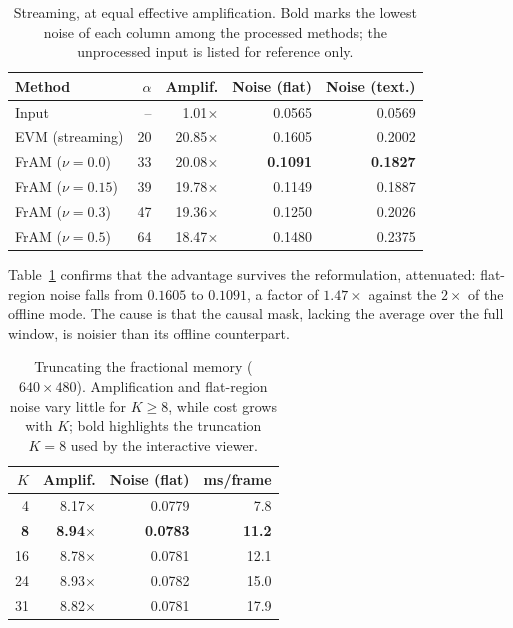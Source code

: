 \documentclass[conference]{IEEEtran}
\begin{document}
\begin{table}[t]
\caption{Streaming, at equal effective amplification. Bold marks the lowest
noise of each column among the processed methods; the unprocessed input is
listed for reference only.}
\label{tab:rt}
\centering
\begin{tabular}{lrrrr}
\toprule
Method & $\alpha$ & Amplif. & Noise (flat) & Noise (text.) \\
\midrule
Input            & --  & 1.01$\times$  & 0.0565 & 0.0569 \\
EVM (streaming)  & 20  & 20.85$\times$ & 0.1605 & 0.2002 \\
FrAM ($\nu=0.0$)  & 33  & 20.08$\times$ & \textbf{0.1091} & \textbf{0.1827} \\
FrAM ($\nu=0.15$) & 39  & 19.78$\times$ & 0.1149 & 0.1887 \\
FrAM ($\nu=0.3$)  & 47  & 19.36$\times$ & 0.1250 & 0.2026 \\
FrAM ($\nu=0.5$)  & 64  & 18.47$\times$ & 0.1480 & 0.2375 \\
\bottomrule
\end{tabular}
\end{table}

Table~\ref{tab:rt} confirms that the advantage survives the reformulation,
attenuated: flat-region noise falls from $0.1605$ to $0.1091$, a factor of
$1.47\times$ against the $2\times$ of the offline mode. The cause is that the
causal mask, lacking the average over the full window, is noisier than its
offline counterpart.

\begin{table}[t]
\caption{Truncating the fractional memory ($640\times480$). Amplification and
flat-region noise vary little for $K \geq 8$, while cost grows with $K$; bold
highlights the truncation $K = 8$ used by the interactive viewer.}
\label{tab:memory}
\centering
\begin{tabular}{rrrr}
\toprule
$K$ & Amplif. & Noise (flat) & ms/frame \\
\midrule
4  & 8.17$\times$ & 0.0779 & 7.8 \\
\textbf{8} & \textbf{8.94}$\times$ & \textbf{0.0783} & \textbf{11.2} \\
16 & 8.78$\times$ & 0.0781 & 12.1 \\
24 & 8.93$\times$ & 0.0782 & 15.0 \\
31 & 8.82$\times$ & 0.0781 & 17.9 \\
\bottomrule
\end{tabular}
\end{table}
\end{document}
